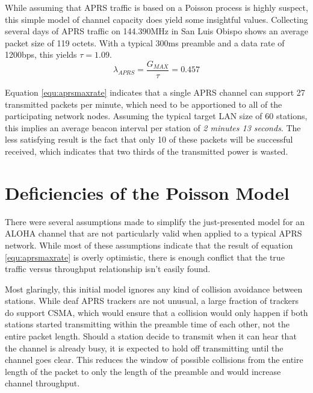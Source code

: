 While assuming that APRS traffic is based on a Poisson process is 
highly suspect, this simple model of channel capacity does yield some insightful 
values. 
Collecting several days of APRS traffic on 144.390MHz in San Luis Obispo
shows an average packet size of 119 octets. With a typical 300ms preamble
and a data rate of 1200bps, this yields $\tau = 1.09$.
\begin{equation}
	\lambda_{APRS} = \frac{G_{MAX}}{\tau} = 0.457
	\label{equ:aprsmaxrate}
\end{equation}

Equation \ref{equ:aprsmaxrate} indicates that a single APRS channel can support
27 transmitted packets per minute, which need to be apportioned to 
all of the participating network nodes. 
Assuming the typical target LAN size of 60 stations, 
this implies an average beacon interval per station of \emph{2 minutes 13 seconds}.
The less satisfying result is the fact that only 10 of these packets will be 
successful received, which indicates that
two thirds of the transmitted power is wasted.

\section{Deficiencies of the Poisson Model}

There were several assumptions made to simplify the just-presented model 
for an ALOHA channel that are not particularly valid 
when applied to a typical APRS network. 
While most of these assumptions indicate that the result of
equation \ref{equ:aprsmaxrate} is overly optimistic, there is enough conflict 
that the true traffic versus throughput relationship isn't easily found.

Most glaringly, this initial model ignores any kind of collision avoidance 
between stations. While deaf APRS trackers are not unusual, a large fraction
of trackers do support CSMA, which would ensure that a collision would
only happen if both stations started transmitting within the preamble time of
each other, not the entire packet length. Should a station decide to
transmit when it can hear that the channel is already busy, it is expected to
hold off transmitting until the channel goes clear. This reduces the window
of possible collisions from the entire length of the packet to only the 
length of the preamble and would increase channel throughput.

